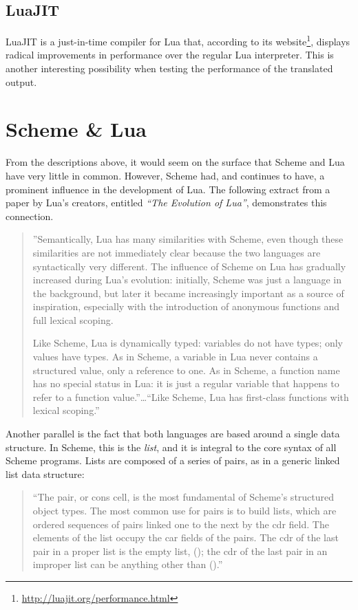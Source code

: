 \subsection{LuaJIT}

LuaJIT\cite{luajit} is a just-in-time compiler for Lua that, according to its
website\footnote{\url{http://luajit.org/performance.html}}, displays radical
improvements in performance over the regular Lua interpreter. This is another
interesting possibility when testing the performance of the translated output.


\section{Scheme \& Lua}

From the descriptions above, it would seem on the surface that Scheme and Lua
have very little in common. However, Scheme had, and continues to have, a
prominent influence in the development of Lua. The following extract from a
paper by Lua's creators, entitled \emph{``The Evolution of Lua''}, demonstrates this connection.

\begin{quotation}
''Semantically, Lua has many similarities with Scheme, even though these
similarities are not immediately clear because the two languages are
syntactically very different. The influence of Scheme on Lua has gradually
increased during Lua's evolution: initially, Scheme was just a language in the
background, but later it became increasingly important as a source of
inspiration, especially with the introduction of anonymous functions and full
lexical scoping.

Like Scheme, Lua is dynamically typed: variables do not have types; only values
have types. As in Scheme, a variable in Lua never contains a structured value,
only a reference to one. As in Scheme, a function name has no special status in
Lua: it is just a regular variable that happens to refer to a function
value.''\ldots ``Like Scheme, Lua has first-class functions with lexical
scoping.''~\cite[Sec~2]{evolua}
\end{quotation}

\label{sec:listandtable}
Another parallel is the fact that both languages are based around a single data
structure. In Scheme, this is the \emph{list}, and it is integral to the core
syntax of all Scheme programs. Lists are composed of a series of pairs, as in a
generic linked list data structure:
\begin{quotation}
``The pair, or cons cell, is the most fundamental of Scheme's structured object
types. The most common use for pairs is to build lists, which are ordered
sequences of pairs linked one to the next by the cdr field. The elements of the
list occupy the car fields of the pairs. The cdr of the last pair in a proper
list is the empty list, (); the cdr of the last pair in an improper list can be
anything other than ().''~\cite[Sec~6.4]{tspl}
\end{quotation}

